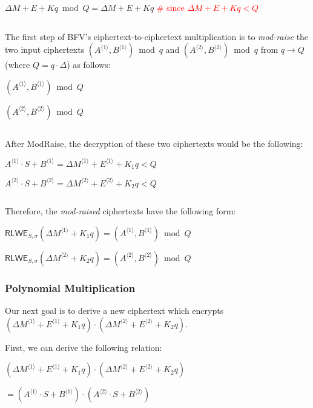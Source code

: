 $\Delta M + E + Kq \bmod Q = \Delta M + E + Kq$ \textcolor{red}{ \#  since $\Delta M + E + Kq < Q$} 

$ $

The first step of BFV's ciphertext-to-ciphertext multiplication is to \textit{mod-raise} the two input ciphertexts $(A^{\langle 1 \rangle}, B^{\langle 1 \rangle}) \bmod q$ and $(A^{\langle 2 \rangle}, B^{\langle 2 \rangle}) \bmod q$  
from $q \rightarrow Q$ (where $Q = q\cdot \Delta$) as follows: 

$(A^{\langle 1 \rangle}, B^{\langle 1 \rangle}) \bmod Q$

$(A^{\langle 2 \rangle}, B^{\langle 2 \rangle}) \bmod Q$

$ $

After \textsf{ModRaise}, the decryption of these two ciphertexts would be the following: 

$A^{\langle 1 \rangle} \cdot S + B^{\langle 1 \rangle} = \Delta M^{\langle 1 \rangle} + E^{\langle 1 \rangle} + K_1q < Q$

$A^{\langle 2 \rangle} \cdot S + B^{\langle 2 \rangle} = \Delta M^{\langle 2 \rangle} + E^{\langle 2 \rangle} + K_2q < Q$


$ $

Therefore, the \textit{mod-raised} ciphertexts have the following form: 

$\textsf{RLWE}_{S, \sigma}(\Delta M^{\langle 1 \rangle} + K_1q) = (A^{\langle 1 \rangle}, B^{\langle 1 \rangle}) \bmod Q$

$\textsf{RLWE}_{S, \sigma}(\Delta M^{\langle 2 \rangle} + K_2q) = (A^{\langle 2 \rangle}, B^{\langle 2 \rangle}) \bmod Q$


\subsubsection{Polynomial Multiplication}
\label{subsubsec:bfv-mult-cipher-multiplication}

Our next goal is to derive a new ciphertext which encrypts 
$(\Delta M^{\langle 1 \rangle} + E^{\langle 1 \rangle} + K_1q) \cdot (\Delta M^{\langle 2 \rangle} + E^{\langle 2 \rangle} + K_2q)$. 

First, we can derive the following relation: 

$(\Delta M^{\langle 1 \rangle} + E^{\langle 1 \rangle} + K_1q) \cdot (\Delta M^{\langle 2 \rangle} + E^{\langle 2 \rangle} + K_2q)$

$ = (A^{\langle 1 \rangle} \cdot S + B^{\langle 1 \rangle}) \cdot (A^{\langle 2 \rangle} \cdot S + B^{\langle 2 \rangle})$

